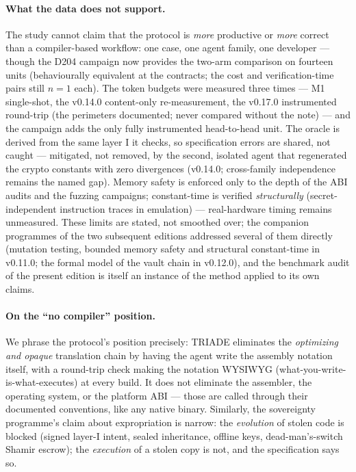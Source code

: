 \documentclass[11pt,a4paper]{article}
\begin{document}
\paragraph{What the data does not support.} The study cannot claim that
the protocol is \emph{more} productive or \emph{more} correct than a
compiler-based workflow: one case, one agent family, one developer ---
though the D204 campaign now provides the two-arm comparison on fourteen
units (behaviourally equivalent at the contracts; the cost and
verification-time pairs still $n{=}1$ each). The token budgets were
measured three times --- M1 single-shot, the v0.14.0 content-only
re-measurement, the v0.17.0 instrumented round-trip (the perimeters
documented; never compared without the note) --- and the campaign adds
the only fully instrumented head-to-head unit. The oracle is derived
from the same layer I it checks, so
specification errors are shared, not caught --- mitigated, not removed,
by the second, isolated agent that regenerated the crypto constants
with zero divergences (v0.14.0; cross-family independence remains the
named gap). Memory safety is enforced
only to the depth of the ABI audits and the fuzzing campaigns;
constant-time is verified \emph{structurally} (secret-independent
instruction traces in emulation) --- real-hardware timing remains
unmeasured. These limits are stated, not smoothed over; the companion
programmes of the two subsequent editions addressed several of them
directly (mutation testing, bounded memory safety and structural
constant-time in v0.11.0; the formal model of the vault chain in
v0.12.0), and the benchmark audit of the present edition is itself an
instance of the method applied to its own claims.

\paragraph{On the ``no compiler'' position.} We phrase the protocol's
position precisely: TRIADE eliminates the \emph{optimizing and opaque}
translation chain by having the agent write the assembly notation itself,
with a round-trip check making the notation WYSIWYG
(what-you-write-is-what-executes) at every build. It does not eliminate
the assembler, the operating system, or the platform ABI --- those are
called through their documented conventions, like any native binary.
Similarly, the sovereignty programme's claim about expropriation is
narrow: the \emph{evolution} of stolen code is blocked (signed layer-I
intent, sealed inheritance, offline keys, dead-man's-switch Shamir
escrow); the \emph{execution} of a stolen copy is not, and the
specification says so.
\end{document}
